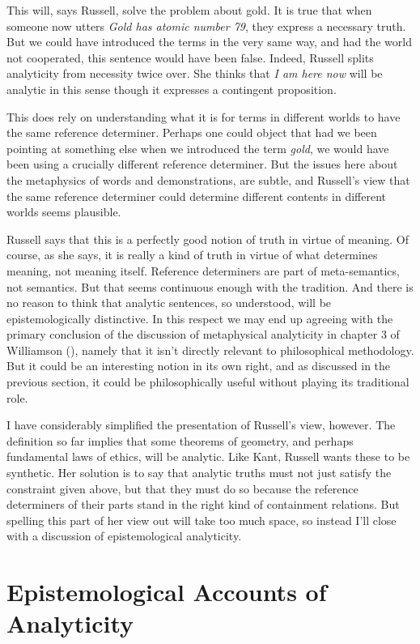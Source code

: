\documentclass[
  10pt,
  letterpaper,
  DIV=11,
  numbers=noendperiod,
  twoside]{scrartcl}
\begin{document}
This will, says Russell, solve the problem about gold. It is true that
when someone now utters \emph{Gold has atomic number 79}, they express a
necessary truth. But we could have introduced the terms in the very same
way, and had the world not cooperated, this sentence would have been
false. Indeed, Russell splits analyticity from necessity twice over. She
thinks that \emph{I am here now} will be analytic in this sense though
it expresses a contingent proposition.

This does rely on understanding what it is for terms in different worlds
to have the same reference determiner. Perhaps one could object that had
we been pointing at something else when we introduced the term
\emph{gold}, we would have been using a crucially different reference
determiner. But the issues here about the metaphysics of words and
demonstrations, are subtle, and Russell's view that the same reference
determiner could determine different contents in different worlds seems
plausible.

Russell says that this is a perfectly good notion of truth in virtue of
meaning. Of course, as she says, it is really a kind of truth in virtue
of what determines meaning, not meaning itself. Reference determiners
are part of meta-semantics, not semantics. But that seems continuous
enough with the tradition. And there is no reason to think that analytic
sentences, so understood, will be epistemologically distinctive. In this
respect we may end up agreeing with the primary conclusion of the
discussion of metaphysical analyticity in chapter 3 of Williamson
(), namely that it isn't
directly relevant to philosophical methodology. But it could be an
interesting notion in its own right, and as discussed in the previous
section, it could be philosophically useful without playing its
traditional role.

I have considerably simplified the presentation of Russell's view,
however. The definition so far implies that some theorems of geometry,
and perhaps fundamental laws of ethics, will be analytic. Like Kant,
Russell wants these to be synthetic. Her solution is to say that
analytic truths must not just satisfy the constraint given above, but
that they must do so because the reference determiners of their parts
stand in the right kind of containment relations. But spelling this part
of her view out will take too much space, so instead I'll close with a
discussion of epistemological analyticity.

\section{Epistemological Accounts of
Analyticity}\label{epistemologicalaccountsofanalyticity}
\end{document}
